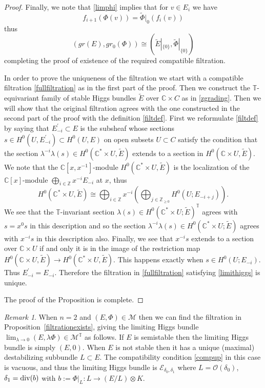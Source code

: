 \documentclass[12pt]{article}
\numberwithin{equation}{section}
\renewcommand{\div}{{\rm div}}
\theoremstyle{remark}
\newtheorem{remark}[theorem]{Remark}
\theoremstyle{definition}
\numberwithin{theorem}{section}
\def\calE{{\mathcal E}}
\def\C{\mathbb{C}}
\def\M{{\mathcal{M}}}
\def\N{\mathbb{Z}_{\geq 0}}
\newcommand{\T}{{\mathbb{T}}}
\def\calO{{\mathcal O}}
\def\Z{\mathbb{Z}}
\renewcommand{\1}{\mathbbm{1}}
\begin{document}
\begin{proof}
	Finally, we note that \eqref{limphi} implies that for $v\in E_i$ we have $$f_{i+1}(\Phi(v))=\tilde{\Phi}|_0(f_i(v))$$ thus $$(gr(E),gr_0(\Phi))\cong(\tilde{E}|_{\{0\}},\tilde{\Phi}|_{\{0\}})$$ completing the proof of existence of the required compatible filtration.
	
	In order to prove the uniqueness of the filtration we start with a compatible filtration \eqref{fullfiltration} as in the first part of the proof. Then we construct the $\T$-equivariant family of stable Higgs bundles $\tilde{E}$ over $\C\times C$ as in \eqref{zgrading}. Then we will show that the original filtration agrees with the one constructed in the second part of the proof with the definition \eqref{filtdef}. First we reformulate \eqref{filtdef} by saying that $E^\prime_{-i}\subset E$ is the subsheaf whose sections $s\in H^0(U,E^\prime_{-i})\subset H^0(U,E)$ on open subsets $U\subset C$ satisfy the condition that the section $\lambda^{-i}\lambda(s)\in H^0(\C^*\times U,\tilde{E})$ extends to a section in $H^0(\C\times U,\tilde{E})$. We note that the $\C[x,x^{-1}]$-module $H^0(\C^*\times U,\tilde{E})$ is the localization of the $\C[x]$-module $\bigoplus_{i\in \Z} x^{-i}E_{-i}$  at $x$, thus $$H^0(\C^*\times U,\tilde{E})\cong \bigoplus_{i\in \Z} x^{-i}\left(\bigoplus_{j\in \N} H^0(U;E_{-i+j})\right). $$ We see that the $\T$-invariant section $\lambda(s)\in H^0(\C^*\times U;\tilde{E})^\T$ agrees with $s=x^0s$ in this description  and so the section $\lambda^{-i}\lambda (s)\in H^0(\C^*\times U;\tilde{E}) $ agrees with $x^{-i}s$ in this description also. Finally, we see that $x^{-i}s$ extends to a section over $\C\times U$ if and only it is in the image of the restriction map $H^0(\C\times U, \tilde{E})\to H^0(\C^*\times U, \tilde{E})$. This happens exactly when $s\in H^0(U;E_{-i})$. Thus $E^\prime_{-i}=E_{-i}$. Therefore the filtration in \eqref{fullfiltration}
	satisfying \eqref{limithiggs} is unique.
	
	The proof of the Proposition is complete. 
\end{proof}

\begin{remark} When $n=2$ and $(E,\Phi)\in \M$ then we can find the filtration in Proposition~\ref{filtrationexists}, giving the limiting Higgs bundle $\lim_{\lambda\to 0}(E,\lambda\Phi)\in \M^\T$ as follows. If $E$ is semistable then the limiting Higgs bundle is simply $(E,0)$. When $E$ is not stable then it has a unique (maximal) destabilizing subbundle $L\subset E$. The compatibility condition \eqref{compup} in this case is vacuous, and thus the limiting Higgs bundle is $\calE_{\delta_0,\delta_1}$ where $L=\calO(\delta_0)$, $\delta_1=\div(b)$ with $b:=\Phi|_L:L\to (E/L)\otimes K$. 
\end{remark}
\end{document}
